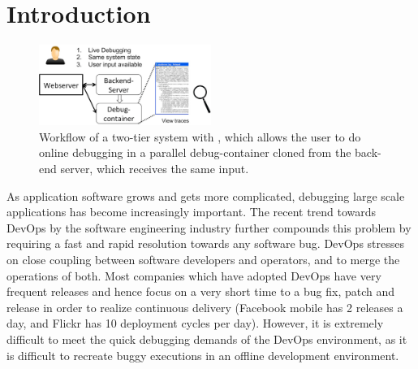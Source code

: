 \section{Introduction}
\label{sec:intro}


\begin{figure}[ht]
  \begin{center}
    \includegraphics[width=0.5\textwidth]{figs/motivation.eps}
    \caption{Workflow of a two-tier system with \parikshan, which allows the user to do online debugging in a parallel debug-container cloned from the back-end server, which receives the same input.}
    \label{fig:motivation}
  \end{center}
\end{figure}

As application software grows and gets more complicated, debugging large scale applications has become increasingly important. 
The recent trend towards DevOps\cite{devops} by the software engineering industry further compounds this problem by requiring a fast and rapid resolution towards any software bug.
DevOps stresses on close coupling between software developers and operators, and to merge the operations of both. 
Most companies which have adopted DevOps have very frequent releases and hence focus on a very short time to a bug fix, patch and release in order to realize continuous delivery (Facebook mobile has 2 releases a day, and Flickr has 10 deployment cycles per day).
However, it is extremely difficult to meet the quick debugging demands of the DevOps environment, as it is difficult to recreate buggy executions in an offline development environment.

